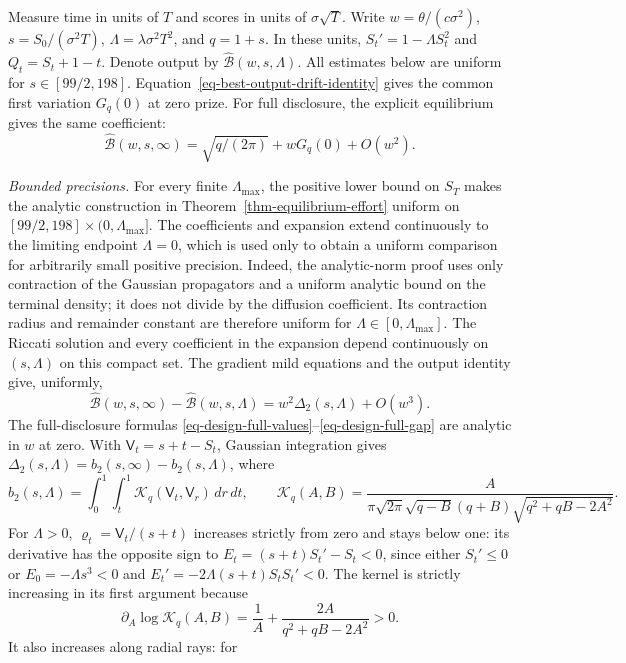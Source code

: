 \documentclass[mnsc]{informs3}
\begin{document}
\begin{APPENDICES}
{
Measure time in units of $T$ and scores in units of $\sigma\sqrt T$.
Write $w=\theta/(c\sigma^2)$, $s=S_0/(\sigma^2T)$,
$\Lambda=\lambda\sigma^2T^2$, and $q=1+s$. In these units,
$S_t'=1-\Lambda S_t^2$ and $Q_t=S_t+1-t$.
Denote output by $\widehat{\mathcal B}(w,s,\Lambda)$.
All estimates below are uniform for $s\in[99/2,198]$.
Equation~\eqref{eq-best-output-drift-identity} gives the common
first variation $G_q(0)$ at zero prize. For full disclosure, the
explicit equilibrium gives the same coefficient:
\begin{equation}\label{eq-design-full-first-variation}
\widehat{\mathcal B}(w,s,\infty)
=\sqrt{q/(2\pi)}+wG_q(0)+O(w^2).
\end{equation}

\emph{Bounded precisions.}
For every finite ${\Lambda_{\max}}$, the positive lower bound on $S_T$ makes
the analytic construction in Theorem~\ref{thm-equilibrium-effort}
uniform on $[99/2,198]\times(0,{\Lambda_{\max}}]$. The coefficients and expansion
extend continuously to the limiting endpoint $\Lambda=0$, which is used only
to obtain a uniform comparison for arbitrarily small positive precision.
Indeed, the analytic-norm proof uses only contraction of the Gaussian
propagators and a uniform analytic bound on the terminal density; it does
not divide by the diffusion coefficient. Its contraction radius and
remainder constant are therefore uniform for $\Lambda\in[0,{\Lambda_{\max}}]$. The Riccati
solution and every coefficient in the expansion depend continuously on
$(s,\Lambda)$ on this compact set.
The gradient mild equations and the output identity give, uniformly,
\[
\widehat{\mathcal B}(w,s,\infty)-\widehat{\mathcal B}(w,s,\Lambda)
=w^2\Delta_2(s,\Lambda)+O(w^3).
\]
The full-disclosure formulas \eqref{eq-design-full-values}--\eqref{eq-design-full-gap}
are analytic in $w$ at zero.
With $\mathsf V_t=s+t-S_t$, Gaussian integration gives
$\Delta_2(s,\Lambda)=b_2(s,\infty)-b_2(s,\Lambda)$, where
\[
b_2(s,\Lambda)=\int_0^1\int_t^1 \mathscr K_q(\mathsf V_t,\mathsf V_r)\,dr\,dt,\qquad
\mathscr K_q(A,B)=\frac{A}{\pi\sqrt{2\pi}\sqrt{q-B}(q+B)
\sqrt{q^2+qB-2A^2}}.
\]
For $\Lambda>0$, $\varrho_t=\mathsf V_t/(s+t)$ increases strictly from zero
and stays below one: its derivative has the opposite sign to
$E_t=(s+t)S_t'-S_t<0$, since either $S_t'\leq0$ or
$E_0=-\Lambda s^3<0$ and $E_t'=-2\Lambda(s+t)S_tS_t'<0$.
The kernel is strictly increasing in its first argument because
\[
\partial_A\log \mathscr K_q(A,B)
=\frac1A+\frac{2A}{q^2+qB-2A^2}>0.
\]
It also increases along radial rays: for
}
\end{APPENDICES}
\end{document}
